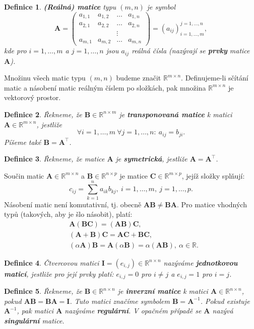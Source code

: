 \documentclass{article}
\newtheorem{df}{Definice}
\newcommand{\0}{\vec{0}}
\newcommand{\A}{\mat A}
\newcommand{\B}{\mat B}
\newcommand{\I}{\mat I}
\newcommand{\mat}[1]{\mathbf{#1}}
\newcommand{\R}{\mathbb R}
\begin{document}
\begin{df}
{\bf (Reálná) matice} typu $(m,n)$ je symbol
$$ \A=\begin{pmatrix}a_{1,1} & a_{1,2} & \ldots & a_{1,n}\\a_{2,1} & a_{2,2} & \ldots & a_{2,n}\\&&\vdots&\\a_{m,1} & a_{m,2} & \ldots & a_{m,n}\end{pmatrix} = (a_{ij})_{i=1,\ldots,m}^{j=1,\ldots,n}, $$
kde pro $i=1,\ldots,m$ a $j=1,\ldots,n$ jsou $a_{ij}$ reálná čísla (nazývají se {\bf prvky} matice $\A$).
% 
% 
\end{df}
Množinu všech matic typu $(m,n)$ budeme značit $\R^{m\times n}$.
Definujeme-li sčítání matic a násobení matic reálným číslem po složkách, pak množina $\R^{m\times n}$ je vektorový prostor.

\begin{df}
Řekneme, že $\B\in\R^{n\times m}$ je {\bf transponovaná matice} k matici $\A\in\R^{m\times n}$, jestliže
$$ \forall i=1,\ldots,m~\forall j=1,\ldots,n:~a_{ij}=b_{ji}. $$
Píšeme také $\B=\A^\top$.
\end{df}
\begin{df}
Řekneme, že matice $\A$ je {\bf symetrická}, jestliže $\A=\A^\top$.
\end{df}
% 
Součin matic $\A\in\R^{m\times n}$ a $\B\in\R^{n\times p}$ je matice $\mat C\in\R^{m\times p}$, jejíž složky splňují:
$$ c_{ij} = \sum_{k=1}^n a_{ik}b_{kj},~i=1,\ldots,m,~j=1,\ldots,p. $$
Násobení matic není komutativní, tj. obecně $\A\B\neq\B\A$.
Pro matice vhodných typů (takových, aby je šlo násobit), platí:
$$ \begin{aligned}
&\A(\B\mat C)=(\A\B)\mat C,\\
&(\A+\B)\mat C=\A\mat C+\B\mat C,\\
&(\alpha\A)\B=\A(\alpha\B)=\alpha(\A\B),~\alpha\in\R.
\end{aligned} $$
\begin{df}
Čtvercovou matici $\I=(e_{i,j})\in\R^{n\times n}$ nazýváme {\bf jednotkovou maticí}, jestliže pro její prvky platí: $e_{i,j}=0$ pro $i\neq j$ a $e_{i,j}=1$ pro $i=j$.
\end{df}
\begin{df}
Řekneme, že $\B\in\R^{n\times n}$ je {\bf inverzní matice} k matici $\A\in\R^{n\times n}$, pokud $\A\B=\B\A=\I$.
Tuto matici značíme symbolem $\B=\A^{-1}$.
Pokud existuje $\A^{-1}$, pak matici $\A$ nazýváme {\bf regulární}. V opačném případě se $\A$ nazývá {\bf singulární} matice.
\end{df}
\end{document}
